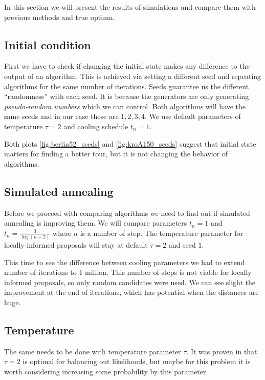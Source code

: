 In this section we will present the results of simulations and compare them with previous methods and true optima.

\subsection{Initial condition}
	First we have to check if changing the initial state makes any difference to the output of an algorithm. This is achieved via setting a different seed and repeating algorithms for the same number of iterations. Seeds guarantee us the different ``randomness'' with each seed. It is because the generators are only generating \textit{pseudo-random numbers} which we can control. Both algorithms will have the same seeds and in our case these are $1,2,3,4$. We use default parameters of temperature $\tau=2$ and cooling schedule $t_n=1$.
	

	Both plots \ref{fig:berlin52_seeds} and \ref{fig:kroA150_seeds} suggest that initial state matters for finding a better tour, but it is not changing the behavior of algorithms.
	
\subsection{Simulated annealing}
	Before we proceed with comparing algorithms we need to find out if simulated annealing is improving them. We will compare parameters $t_n=1$ and $t_n= \frac{3}{\log(n+2)}$ where $n$ is a number of step. The temperature parameter for locally-informed proposals will stay at default $\tau=2$ and seed $1$.
	
	
	
	This time to see the difference between cooling parameters we had to extend number of iterations to 1 million. This number of steps is not viable for locally-informed proposals, so only random candidates were used. We can see slight the improvement at the end of iterations, which has potential when the distances are huge. 
	
\subsection{Temperature}
	The same needs to be done with temperature parameter $\tau$. It was proven in \cite{zanella2020informed} that $\tau=2$ is optimal for balancing out likelihoods, but maybe for this problem it is worth considering increasing some probability by this parameter.
	
